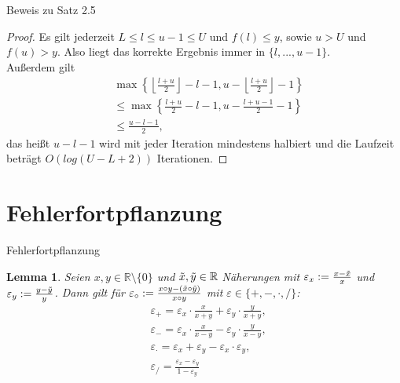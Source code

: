 \documentclass{beamer}
\newcommand{\R}{\mathbb{R}} %
\newtheorem{lem}[satz]{Lemma}
\begin{document}
  \begin{frame}{Beweis zu Satz 2.5}
      \begin{proof}
      Es gilt jederzeit $L \leq l \leq u-1 \leq U$ und $f(l) \leq y$, sowie $u>U$ und $f(u)>y$. Also liegt das korrekte Ergebnis immer in $\{l,...,u-1\}$. \\ 
      Außerdem gilt 
      \begin{align*}
        &\max\left\{ \left\lfloor \frac{l+u}{2}\right\rfloor -l-1, u- \left\lfloor \frac{l+u}{2} \right\rfloor -1 \right\} \\
        &\leq \max \left\{ \frac{l+u}{2}-l-1, u- \frac{l+u-1}{2}-1 \right\} \\
        &\leq \frac{u-l-1}{2},
     \end{align*}
     das heißt $u-l-1$ wird mit jeder Iteration mindestens halbiert und die Laufzeit beträgt $O(log(U-L+2))$ Iterationen.
   \end{proof}
  \end{frame}

\section{Fehlerfortpflanzung}
  \begin{frame}{Fehlerfortpflanzung}
      \begin{lem}
        Seien $x,y \in \R\setminus\{0\}$ und $\Tilde{x}, \Tilde{y} \in \R$ Näherungen mit $\varepsilon_x:= \frac{x- \Tilde{x}}{x}$ und $\varepsilon_y:= \frac{y- \Tilde{y}}{y}$. Dann gilt für $\varepsilon_\circ := \frac{x \circ y- (\Tilde{x} \circ \Tilde{y})}{x \circ y}$ mit $\varepsilon \in \{+,-,\cdot,/\}$: 
         \begin{align*}
           &\varepsilon_+= \varepsilon_x \cdot \frac{x}{x+y}+ \varepsilon_y \cdot \frac{y}{x+y}, \\
           &\varepsilon_-= \varepsilon_x \cdot \frac{x}{x-y}- \varepsilon_y \cdot \frac{y}{x-y}, \\
           &\varepsilon_{\cdot}= \varepsilon_x + \varepsilon_y- \varepsilon_x \cdot \varepsilon_y, \\
           &\varepsilon_/ = \frac{\varepsilon_x- \varepsilon_y}{1- \varepsilon_y}
         \end{align*}
       \end{lem}
  \end{frame}
\end{document}
